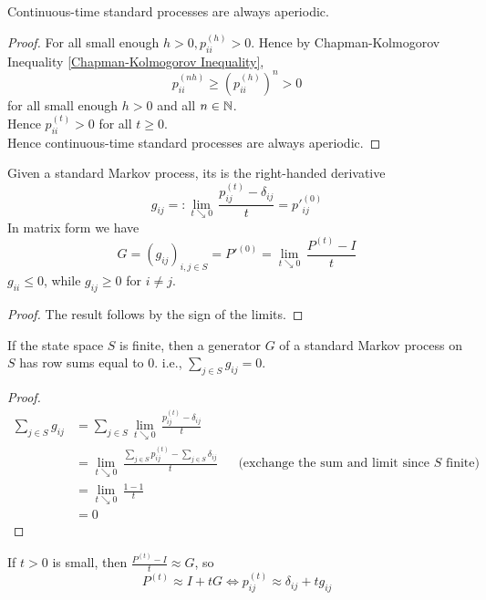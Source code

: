 \documentclass[11pt]{article}
\newcommand{\dur}[3]{{#1}_{#2}^{({#3})}}
\begin{document}
    \property[aperiodic]
    Continuous-time standard processes are always aperiodic.
    \begin{proof}
    For all small enough $h > 0, \dur{p}{ii}{h} > 0$. Hence by Chapman-Kolmogorov Inequality \ref{Chapman-Kolmogorov Inequality}, 
    $$\dur{p}{ii}{nh} \geq \left( \dur{p}{ii}{h} \right)^n > 0$$
    for all small enough $h > 0$ and all $n \in \mathbb{N}$.\\
    Hence $\dur{p}{ii}{t} > 0$ for all $t \geq 0$. \\
    Hence continuous-time standard processes are always aperiodic.	
    \end{proof}
    
     Given a standard Markov process, its  is the right-handed derivative
    $$g_{ij} =: \underset{t \searrow 0}{\lim}\, \frac{\dur{p}{ij}{t} - \delta_{ij}}{t} = \dur{p'}{ij}{0}$$
    In matrix form we have
    $$G = (g_{ij})_{i,j \in S} = P'^{(0)} = \underset{t \searrow 0}{\lim}\, \frac{P^{(t)}-I}{t}$$
    \property
    $g_{ii} \leq 0$, while $g_{ij} \geq 0$ for $i \neq j$.\\
    \begin{proof}
    	The result follows by the sign of the limits.
    \end{proof}
    \property
    If the state space $S$ is finite, then a generator $G$ of a standard Markov process on $S$ has row sums equal to 0. i.e., $\sum_{j\in S}g_{ij} = 0$.
    \begin{proof}
    	\begin{align*}
    		\sum_{j \in S}g_{ij} &= \sum_{j \in S} \underset{t \searrow 0}{\lim}\, \frac{\dur{p}{ij}{t}-\delta_{ij}}{t} \\
    		&= \underset{t \searrow 0}{\lim}\, \frac{\sum_{j \in S}\dur{p}{ij}{t} - \sum_{j \in S}\delta_{ij}}{t} &&\text{(exchange the sum and limit since $S$ finite)}\\
    		&= \underset{t \searrow 0}{\lim}\, \frac{1-1}{t} \\
    		&= 0
    	\end{align*}
    \end{proof}
    \property \label{small t}
    If $t > 0$ is small, then $\frac{P^{(t)}-I}{t} \approx G$, so
    $$P^{(t)} \approx I + tG \iff \dur{p}{ij}{t} \approx \delta_{ij} + tg_{ij}$$
\end{document}
